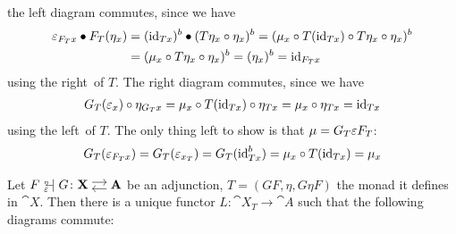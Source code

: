 \begin{beweis}
\begin{itemize1}
\begin{figure}[H]
\begin{subfigure}{0.4\textwidth}
    \end{subfigure}
    \hspace{2em}
    \begin{subfigure}{0.4\textwidth}
    \centering
    \end{subfigure}
    \end{figure}
    the left diagram commutes, since we have
    \begin{align*}
        \varepsilon_{F_Tx} \bullet F_T(\eta_x) &= (\operatorname{id}_{Tx})^b \bullet (T\eta_x \circ \eta_x)^b 
        = (\mu_x \circ T(\operatorname{id}_{Tx}) \circ T\eta_x \circ \eta_x)^b \\
        &= (\mu_x \circ T\eta_x \circ \eta_x)^b  
        = (\eta_x)^b = \operatorname{id}_{F_Tx}
    \end{align*}
    using the right~ of $T$.
    The right diagram commutes, since we have
    \begin{align*}
        G_T(\varepsilon_x) \circ \eta_{G_Tx} = \mu_x \circ T(\operatorname{id}_{Tx}) \circ \eta_{Tx}
        = \mu_x \circ \eta_{Tx} = \operatorname{id}_{Tx}
    \end{align*}
    using the left~ of $T$. The only thing left to show is that
    $\mu = G_T \varepsilon F_T$:
    \begin{align*}
        G_T(\varepsilon_{F_Tx}) = G_T(\varepsilon_{x_T}) = G_T(\operatorname{id}_{Tx}^b) = \mu_x \circ T(\operatorname{id}_{Tx}) = \mu_x
    \end{align*}
    \end{itemize1}
\end{beweis}
\begin{theorem}
    Let $F {\ }_{\eps}^{\text{\tiny{$\eta$}}}\!\!\!\!\adj G \colon \adjar{X}{A}$ be an adjunction,
    $T = (GF,\eta,G\eta F)$ the monad it defines in $\cat{X}$. Then there is a unique functor
    $L \colon \cat{X_T} \to \cat{A}$ such that the following diagrams commute:
\end{theorem}
